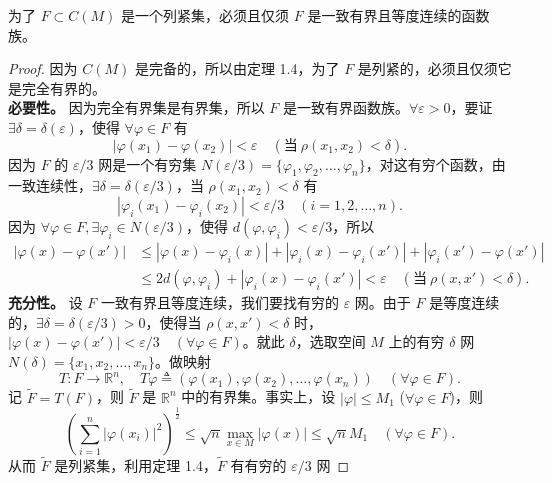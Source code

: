 \documentclass[lang=cn,newtx,10pt,scheme=chinese,thmcnt=chapter]{elegantbook}
\begin{document}
\begin{theorem}
为了 \( F \subset C(M) \) 是一个列紧集，必须且仅须 \( F \) 是一致有界且等度连续的函数族。
\end{theorem}
\begin{proof}
因为 \( C(M) \) 是完备的，所以由定理 1.4，为了 \( F \) 是列紧的，必须且仅须它是完全有界的。\\
\textbf{必要性。} 因为完全有界集是有界集，所以 \( F \) 是一致有界函数族。\( \forall \varepsilon > 0 \)，要证 \( \exists \delta = \delta(\varepsilon) \)，使得 \( \forall \varphi \in F \) 有
\[
\left|\varphi(x_1) - \varphi(x_2)\right| < \varepsilon \quad (\text{当} \ \rho(x_1, x_2) < \delta).
\]
因为 \( F \) 的 \( \varepsilon/3 \) 网是一个有穷集 \( N(\varepsilon/3) = \{ \varphi_1, \varphi_2, \dots, \varphi_n \} \)，对这有穷个函数，由一致连续性，\( \exists \delta = \delta(\varepsilon/3) \)，当 \( \rho(x_1, x_2) < \delta \) 有
\[
\left|\varphi_i(x_1) - \varphi_i(x_2)\right| < \varepsilon/3 \quad (i = 1, 2, \dots, n).
\]
因为 \( \forall \varphi \in F, \exists \varphi_i \in N(\varepsilon/3) \)，使得 \( d(\varphi, \varphi_i) < \varepsilon/3 \)，所以
\[
\begin{aligned}
\left|\varphi(x) - \varphi(x')\right| &\leqslant \left|\varphi(x) - \varphi_i(x)\right| + \left|\varphi_i(x) - \varphi_i(x')\right| + \left|\varphi_i(x') - \varphi(x')\right| \\
&\leqslant 2 d(\varphi, \varphi_i) + \left|\varphi_i(x) - \varphi_i(x')\right| < \varepsilon \quad (\text{当} \ \rho(x, x') < \delta).
\end{aligned}
\]
\textbf{充分性。} 设 \( F \) 一致有界且等度连续，我们要找有穷的 \( \varepsilon \) 网。由于 \( F \) 是等度连续的，\( \exists \delta = \delta(\varepsilon/3) > 0 \)，使得当 \( \rho(x, x') < \delta \) 时，\( \left|\varphi(x) - \varphi(x')\right| < \varepsilon/3 \quad (\forall \varphi \in F) \)。就此 \( \delta \)，选取空间 \( M \) 上的有穷 \( \delta \) 网 \( N(\delta) = \{ x_1, x_2, \dots, x_n \} \)。做映射
\[
T: F \to \mathbb{R}^n, \quad T\varphi \triangleq \left( \varphi(x_1), \varphi(x_2), \dots, \varphi(x_n) \right) \quad (\forall \varphi \in F).
\]
记 \( \widetilde{F} = T(F) \)，则 \( \widetilde{F} \) 是 \( \mathbb{R}^n \) 中的有界集。事实上，设 \( |\varphi| \leqslant M_1 \) (\( \forall \varphi \in F \))，则
\[
\left( \sum_{i=1}^n \left| \varphi(x_i) \right|^2 \right)^{\frac{1}{2}} \leqslant \sqrt{n} \max_{x \in M} |\varphi(x)| \leqslant \sqrt{n} M_1 \quad (\forall \varphi \in F).
\]
从而 \( \widetilde{F} \) 是列紧集，利用定理 1.4，\( \widetilde{F} \) 有有穷的 \( \varepsilon/3 \) 网

\end{proof}
\end{document}
